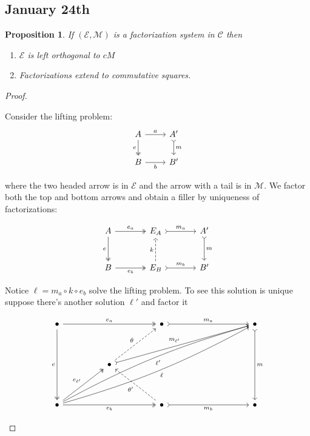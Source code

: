 \documentclass[11pt]{amsart}
\theoremstyle{plain}
\newtheorem{prop}[thm]{Proposition}
\theoremstyle{definition}
\newcommand{\cC}{{\mathcal C}}
\newcommand{\cE}{{\mathcal E}}
\newcommand{\cM}{{\mathcal M}}
\newcommand{\noi}{{\noindent}}
\begin{document}
\subsection{January 24th}

\begin{prop}
  If $(\cE, \cM)$ is a factorization system in $\cC$ then
  
  \begin{enumerate}[label=(\alph*)]
  \item $\cE $ is left orthogonal to $cM$
  \item Factorizations extend to commutative squares.
  \end{enumerate} 
  \end{prop}
  \begin{proof}
  \begin{enumerate}
    Consider the lifting problem: 
    \[\begin{tikzcd}
      A \rar["a"] \dar[two heads,"e"'] & A' \dar[tail, "m"] \\
      B \rar["b"'] & B'
      \end{tikzcd}\]

  \noi where the two headed arrow is in $\cE$ and the arrow with a tail is in $\cM$. We factor both the top and bottom arrows and obtain a filler by uniqueness of factorizations: 

  \[\begin{tikzcd}[column sep = large, row sep = large]
    A \rar[two heads, "e_a"] \dar[two heads,"e"'] & E_A \rar[tail, "m_a"] &  A' \dar[tail, "m"] \\
    B \rar[two heads, "e_b"'] & E_B \uar[dashed, "k"] \rar[tail, "m_b"] & B'
    \end{tikzcd}\]

  Notice $\ell = m_a \circ k \circ e_b$ solve the lifting problem. To see this solution is unique suppose there's another solution $\ell'$ and factor it

  \[\begin{tikzcd}[column sep =huge, row sep = huge]
    \bullet && \bullet && \bullet \\
    & \bullet \\
    \bullet && \bullet && \bullet
    \arrow["e"', two heads, from=1-1, to=3-1]
    \arrow["{e_a}", two heads, from=1-1, to=1-3]
    \arrow["{e_{\ell'}}", two heads, from=3-1, to=2-2]
    \arrow["\theta", dashed, from=2-2, to=1-3]
    \arrow["{m_a}", tail, from=1-3, to=1-5]
    \arrow["{m_{\ell'}}", tail, from=2-2, to=1-5]
    \arrow["\ell"', bend left=-6, from=3-1, to=1-5]
    \arrow["{\ell'}"', bend left=6, from=3-1, to=1-5]
    \arrow["{e_b}"', two heads, from=3-1, to=3-3]
    \arrow["{m_b}"', tail, from=3-3, to=3-5]
    \arrow["m", tail, from=1-5, to=3-5]
    \arrow["{\theta'}", dashed, from=3-3, to=2-2]
\end{tikzcd}\]


\end{enumerate}
\end{proof}
\end{document}
